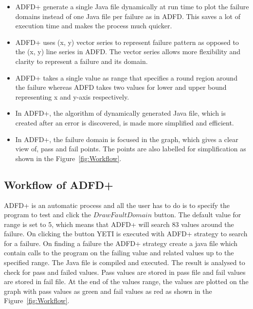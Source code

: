 \documentclass{acm_proc_article-sp}
\begin{document}
\begin{itemize}
\item ADFD+ generate a single Java file dynamically at run time to plot the failure domains instead of one Java file per failure as in ADFD. This saves a lot of execution time and makes the process much quicker.

\item ADFD+ uses (x, y) vector series to represent failure pattern as opposed to the (x, y) line series in ADFD. The vector series allows more flexibility and clarity to represent a failure and its domain.   

\item ADFD+ takes a single value as range that specifies a round region around the failure whereas ADFD takes two values for lower and upper bound representing x and y-axis respectively.

\item In ADFD+, the algorithm of dynamically generated Java file, which is created after an error is discovered, is made more simplified and efficient.

\item In ADFD+, the failure domain is focused in the graph, which gives a clear view of, pass and fail points. The points are also labelled for simplification as shown in the Figure~\ref{fig:Workflow}. 

\end{itemize}



\subsection{Workflow of ADFD+}
ADFD+ is an automatic process and all the user has to do is to specify the program to test and click the $Draw Fault Domain$ button. The default value for range is set to 5, which means that ADFD+ will search 83 values around the failure. On clicking the button YETI is executed with ADFD+ strategy to search for a failure. On finding a failure the ADFD+ strategy create a java file which contain calls to the program on the failing value and related values up to the specified range. The Java file is compiled and executed. The result is analysed to check for pass and failed values. Pass values are stored in pass file and fail values are stored in fail file. At the end of the values range, the values are plotted on the graph with pass values as green and fail values as red as shown in the Figure~\ref{fig:Workflow}.
\end{document}
